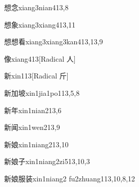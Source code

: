 \begin{verbete}{想念}{xiang3nian4}{13,8}
\end{verbete}

\begin{verbete}{想象}{xiang3xiang4}{13,11}
\end{verbete}

\begin{verbete}{想想看}{xiang3xiang3kan4}{13,13,9}
\end{verbete}

\begin{verbete}{像}{xiang4}{13}[Radical 人]
\end{verbete}

\begin{verbete}{新}{xin1}{13}[Radical 斤]
\end{verbete}

\begin{verbete}{新加坡}{xin1jia1po1}{13,5,8}
\end{verbete}

\begin{verbete}{新年}{xin1nian2}{13,6}
\end{verbete}

\begin{verbete}{新闻}{xin1wen2}{13,9}
\end{verbete}

\begin{verbete}{新娘}{xin1niang2}{13,10}
\end{verbete}

\begin{verbete}{新娘子}{xin1niang2zi5}{13,10,3}
\end{verbete}

\begin{verbete}{新娘服装}{xin1niang2 fu2zhuang1}{13,10,8,12}
\end{verbete}


